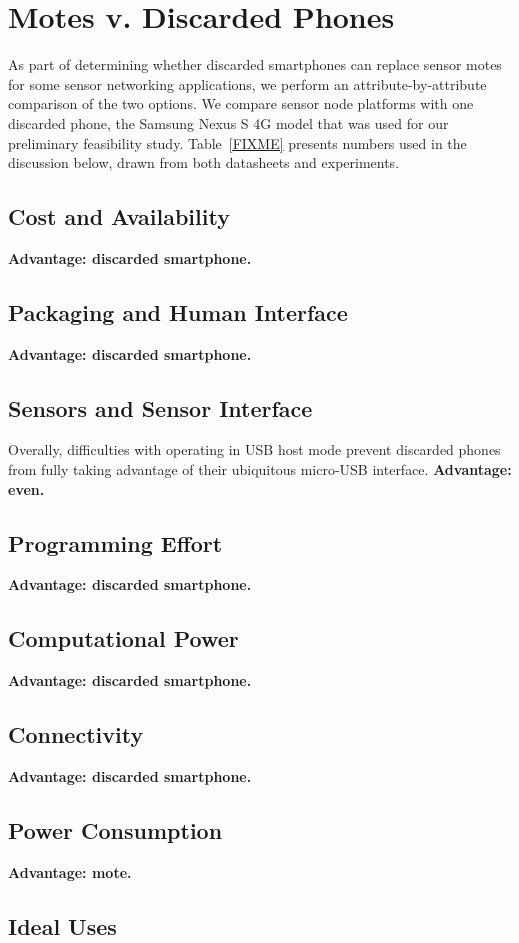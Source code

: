 \section{Motes v. Discarded Phones}
\label{sec-comparison}

As part of determining whether discarded smartphones can replace sensor motes
for some sensor networking applications, we perform an attribute-by-attribute
comparison of the two options. We compare  sensor node
platforms with one discarded phone, the Samsung Nexus S 4G model that was
used for our preliminary feasibility study. Table~\ref{FIXME} presents
numbers used in the discussion below, drawn from both datasheets and
experiments.

\subsection{Cost and Availability}

\textbf{Advantage: discarded smartphone.}

\subsection{Packaging and Human Interface}

\textbf{Advantage: discarded smartphone.}

\subsection{Sensors and Sensor Interface}

Overally, difficulties with operating in USB host mode prevent discarded
phones from fully taking advantage of their ubiquitous micro-USB interface.
\textbf{Advantage: even.}

\subsection{Programming Effort}

\textbf{Advantage: discarded smartphone.}

\subsection{Computational Power}

\textbf{Advantage: discarded smartphone.}

\subsection{Connectivity}

\textbf{Advantage: discarded smartphone.}

\subsection{Power Consumption}

\textbf{Advantage: mote.}

\subsection{Ideal Uses}
